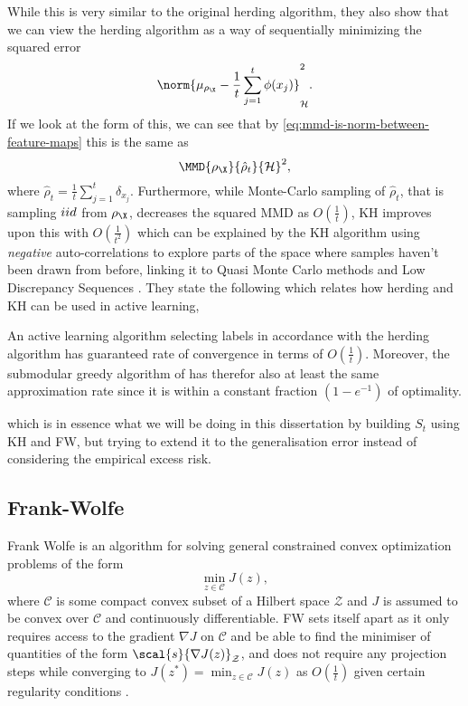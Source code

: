 While this is very similar to the original herding algorithm, they also show
that we can view the herding algorithm as a way of sequentially minimizing the
squared error
\begin{equation}
\label{eq:squared-error-herding} \norm{\mu_{\rho_{\X}} - \frac{1}{t}
\sum_{j=1}^{t} \phi(x_{j})}_{\rkhs{H}}^{2}.
\end{equation} If we look at the form of this, we can see that by
\ref{eq:mmd-is-norm-between-feature-maps} this is the same as
\begin{equation} \MMD{\rho_{\X}}{\hat{\rho}_{t}}{\rkhs{H}}^{2},
\end{equation} where \(\hat{\rho}_{t} = \frac{1}{t} \sum_{j=1}^{t}
\delta_{x_{j}}\). Furthermore, while Monte-Carlo sampling of \(\hat{\rho}_{t}\), that
is sampling \(iid\) from \(\rho_{\X}\), decreases the squared MMD as
\(O(\frac{1}{t})\), KH improves upon this with \(O(\frac{1}{t^{2}})\) which can
be explained by the KH algorithm using \emph{negative} auto-correlations to
explore parts of the space where samples haven't been drawn from before, linking
it to Quasi Monte Carlo methods and Low Discrepancy Sequences
\cite{chen12_super_sampl_from_kernel_herdin,bach12_equiv_between_herdin_condit_gradien_algor}.
They state the following which relates how herding and KH can be used in active
learning,
\begin{corollary} An
active learning algorithm selecting labels in accordance with the herding
algorithm has guaranteed rate of convergence in terms of \(O(\frac{1}{t})\).
Moreover, the submodular greedy algorithm of
\cite{krause08_near_optim_sensor_placem_gauss_proces} has therefor also at least
the same approximation rate since it is within a constant fraction \((1 -
e^{-1})\) of optimality.
\end{corollary}
which is in essence what we will be doing in this dissertation by building
\(S_t\) using KH and FW, but trying to extend
it to the generalisation error instead of considering the empirical excess risk.

\subsection{Frank-Wolfe} Frank Wolfe
\cite{frank56_algor_quadr_progr} is an algorithm for solving general constrained
convex optimization problems of the form
\begin{equation}
\label{eq:constrainted-convex-opt-problem} \min_{z \in \mathcal{C}} J(z),
\end{equation} where \(\mathcal{C}\) is some compact convex subset of a Hilbert
space \(\mathcal{Z}\) and \(J\) is assumed to be convex over \(\mathcal{C}\) and
continuously differentiable. FW sets itself apart as it only requires access to
the gradient \(\nabla J\) on \(\mathcal{C}\) and be able to find the minimiser
of quantities of the form \(\scal{s}{\nabla J(z)}_{\mathcal{Z}}\), and does not
require any projection steps while converging to \(J(z^{\ast}) = \min_{z
\in \mathcal{C}} J(z)\) as \(O(\frac{1}{t})\) given certain regularity
conditions \cite{jaggi13_revis_frank_wolfe}.

